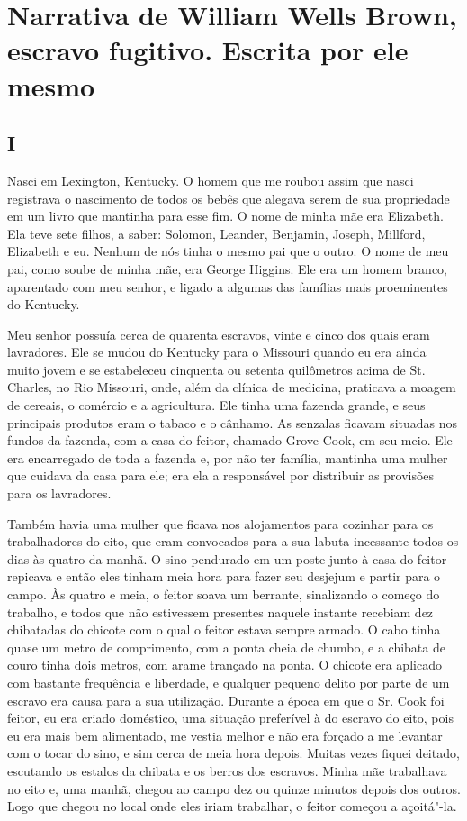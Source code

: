\movetooddpage
{}
\part*{Narrativa de William Wells Brown, escravo fugitivo. Escrita por ele mesmo}


\chapter{I}

Nasci em Lexington, Kentucky. O homem que me roubou assim que nasci \label{ref5}
registrava o nascimento de todos os bebês que alegava serem de sua
propriedade em um livro que mantinha para esse fim. O nome de minha mãe
era Elizabeth. Ela teve sete filhos, a saber: Solomon, Leander,
Benjamin, Joseph, Millford, Elizabeth e eu. Nenhum de nós tinha o mesmo
pai que o outro. O nome de meu pai, como soube de minha mãe, era George
Higgins. Ele era um homem branco, aparentado com meu senhor, e ligado a
algumas das famílias mais proeminentes do Kentucky.

Meu senhor possuía cerca de quarenta escravos, vinte e cinco dos quais
eram lavradores. Ele se mudou do Kentucky para o Missouri quando eu era
ainda muito jovem e se estabeleceu cinquenta ou setenta quilômetros
acima de St. Charles, no Rio Missouri, onde, além da clínica de
medicina, praticava a moagem de cereais, o comércio e a agricultura. Ele
tinha uma fazenda grande, e seus principais produtos eram o tabaco e o
cânhamo. As senzalas ficavam situadas nos fundos da fazenda, com a casa
do feitor, chamado Grove Cook, em seu meio. Ele era encarregado de toda
a fazenda e, por não ter família, mantinha uma mulher que cuidava da
casa para ele; era ela a responsável por distribuir as provisões para os
lavradores.

Também havia uma mulher que ficava nos alojamentos para cozinhar para os
trabalhadores do eito, que eram convocados para a sua labuta incessante
todos os dias às quatro da manhã. O sino pendurado em um poste junto à
casa do feitor repicava e então eles tinham meia hora para fazer seu
desjejum e partir para o campo. Às quatro e meia, o feitor soava um
berrante, sinalizando o começo do trabalho, e todos que não estivessem
presentes naquele instante recebiam dez chibatadas do chicote com o qual
o feitor estava sempre armado. O cabo tinha quase um metro de
comprimento, com a ponta cheia de chumbo, e a chibata de couro tinha
dois metros, com arame trançado na ponta. O chicote era aplicado com
bastante frequência e liberdade, e qualquer pequeno delito por parte de
um escravo era causa para a sua utilização. Durante a época em que o Sr.
Cook foi feitor, eu era criado doméstico, uma situação preferível à do
escravo do eito, pois eu era mais bem alimentado, me vestia melhor e não
era forçado a me levantar com o tocar do sino, e sim cerca de meia hora
depois. Muitas vezes fiquei deitado, escutando os estalos da chibata e
os berros dos escravos. Minha mãe trabalhava no eito e, uma manhã,
chegou ao campo dez ou quinze minutos depois dos outros. Logo que chegou
no local onde eles iriam trabalhar, o feitor começou a açoitá"-la.

